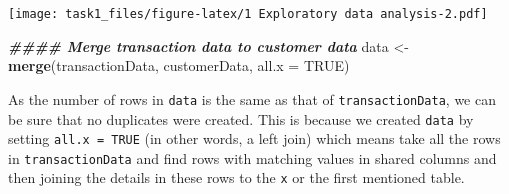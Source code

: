 \documentclass[
]{article}
\newenvironment{Shaded}{\begin{snugshade}}{\end{snugshade}}
\newcommand{\AttributeTok}[1]{\textcolor[rgb]{0.13,0.29,0.53}{#1}}
\newcommand{\ConstantTok}[1]{\textcolor[rgb]{0.56,0.35,0.01}{#1}}
\newcommand{\DecValTok}[1]{\textcolor[rgb]{0.00,0.00,0.81}{#1}}
\newcommand{\DocumentationTok}[1]{\textcolor[rgb]{0.56,0.35,0.01}{\textbf{\textit{#1}}}}
\newcommand{\FloatTok}[1]{\textcolor[rgb]{0.00,0.00,0.81}{#1}}
\newcommand{\FunctionTok}[1]{\textcolor[rgb]{0.13,0.29,0.53}{\textbf{#1}}}
\newcommand{\NormalTok}[1]{#1}
\newcommand{\OtherTok}[1]{\textcolor[rgb]{0.56,0.35,0.01}{#1}}
\newcommand{\SpecialCharTok}[1]{\textcolor[rgb]{0.81,0.36,0.00}{\textbf{#1}}}
\newcommand{\StringTok}[1]{\textcolor[rgb]{0.31,0.60,0.02}{#1}}
\begin{document}
\begin{Shaded}
\end{Shaded}

\texttt{[image: task1\_files/figure-latex/1 Exploratory data analysis-2.pdf]}

\begin{Shaded}
\begin{Highlighting}[]
\DocumentationTok{\#\#\#\# Merge transaction data to customer data}
\NormalTok{data }\OtherTok{\textless{}{-}} \FunctionTok{merge}\NormalTok{(transactionData, customerData, }\AttributeTok{all.x =} \ConstantTok{TRUE}\NormalTok{)}
\end{Highlighting}
\end{Shaded}

As the number of rows in \texttt{data} is the same as that of
\texttt{transactionData}, we can be sure that no duplicates were
created. This is because we created \texttt{data} by setting
\texttt{all.x\ =\ TRUE} (in other words, a left join) which means take
all the rows in \texttt{transactionData} and find rows with matching
values in shared columns and then joining the details in these rows to
the \texttt{x} or the first mentioned table.
\end{document}
